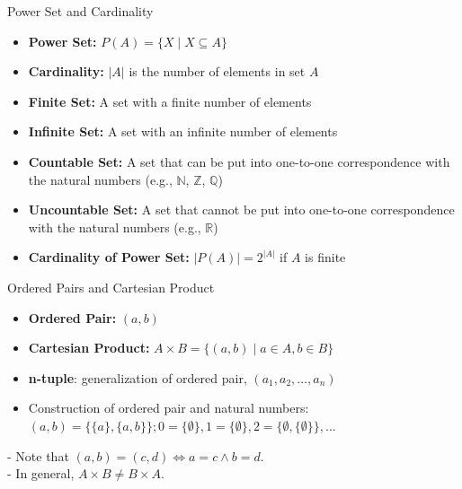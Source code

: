 \documentclass[dvipsnames]{beamer}
\theoremstyle{plain}
\theoremstyle{definition}
\begin{document}
\begin{frame}{Power Set and Cardinality}

\begin{itemize}
    \item \textbf{Power Set:} $P(A) = \{ X \mid X \subseteq A \}$
    \item \textbf{Cardinality:} $|A|$ is the number of elements in set $A$
    \item \textbf{Finite Set:} A set with a finite number of elements
    \item \textbf{Infinite Set:} A set with an infinite number of elements
    \item \textbf{Countable Set:} A set that can be put into one-to-one correspondence with the natural numbers (e.g., $\mathbb{N}$, $\mathbb{Z}$, $\mathbb{Q}$)
    \item \textbf{Uncountable Set:} A set that cannot be put into one-to-one correspondence with the natural numbers (e.g., $\mathbb{R}$)
    \item \textbf{Cardinality of Power Set:} $|P(A)| = 2^{|A|}$ if $A$ is finite
\end{itemize}

\end{frame}

\begin{frame}{Ordered Pairs and Cartesian Product}
\begin{itemize}
    \item \textbf{Ordered Pair:} $(a,b)$
    \item \textbf{Cartesian Product:} $A \times B = \{ (a,b) \mid a \in A, b \in B \}$
    \item \textbf{n-tuple}: generalization of ordered pair, $(a_1, a_2, \ldots, a_n)$
    \item Construction of ordered pair and natural numbers: $(a,b) = \{\{a\}, \{a,b\}\}; 0 = \{\emptyset\}, 1 = \{\emptyset\}, 2 = \{\emptyset, \{\emptyset\}\}, ...$
\end{itemize}
\vspace{0.5em}
- Note that \((a,b) = (c,d) \iff a = c \wedge b = d\).\\
- In general, $A \times B \neq B \times A$.
\end{frame}
\end{document}
